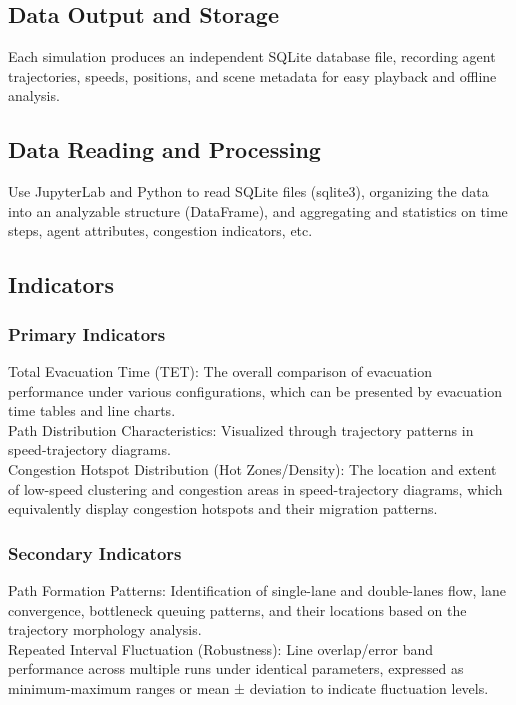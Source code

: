 \subsection{Data Output and Storage}
Each simulation produces an independent SQLite database file, recording agent trajectories, speeds, positions, and scene metadata for easy playback and offline analysis.
\subsection{Data Reading and Processing}
Use JupyterLab and Python to read SQLite files (sqlite3), organizing the data into an analyzable structure (DataFrame), and aggregating and statistics on time steps, agent attributes, congestion indicators, etc.

\subsection{Indicators}
\subsubsection{Primary Indicators}
Total Evacuation Time (TET): The overall comparison of evacuation performance under various configurations, which can be presented by evacuation time tables and line charts.
\\
Path Distribution Characteristics: Visualized through trajectory patterns in speed-trajectory diagrams.
\\
Congestion Hotspot Distribution (Hot Zones/Density): The location and extent of low-speed clustering and congestion areas in speed-trajectory diagrams, which equivalently display congestion hotspots and their migration patterns.
\\
\subsubsection{Secondary Indicators}
Path Formation Patterns: Identification of single-lane and double-lanes flow, lane convergence, bottleneck queuing patterns, and their locations based on the trajectory morphology analysis.
\\
Repeated Interval Fluctuation (Robustness): Line overlap/error band performance across multiple runs under identical parameters, expressed as minimum-maximum ranges or mean ± deviation to indicate fluctuation levels.

